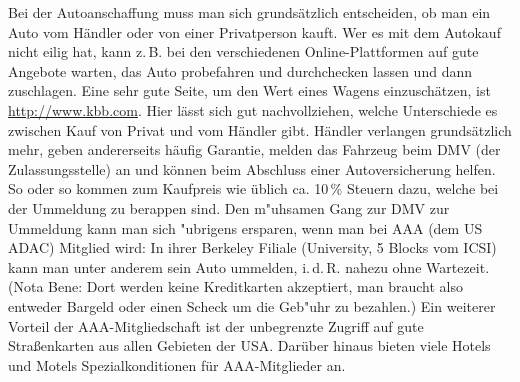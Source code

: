 \documentclass[a4paper]{scrreprt}
\begin{document}
Bei der Autoanschaffung muss man sich grundsätzlich entscheiden, ob man ein Auto vom Händler oder von einer Privatperson kauft. 
Wer es mit dem Autokauf nicht eilig hat, kann z.\,B. bei den verschiedenen Online-Plattformen auf gute Angebote warten, das Auto probefahren und durchchecken lassen und dann zuschlagen. 
Eine sehr gute Seite, um den Wert eines Wagens einzuschätzen, ist \url{http://www.kbb.com}. 
Hier lässt sich gut nachvollziehen, welche Unterschiede es zwischen Kauf von Privat und vom Händler gibt. 
Händler verlangen grundsätzlich mehr, geben andererseits häufig Garantie, melden das Fahrzeug beim DMV (der Zulassungsstelle) an und können beim Abschluss einer Autoversicherung helfen. 
So oder so kommen zum Kaufpreis wie üblich ca. 10\,\% Steuern dazu, welche bei der Ummeldung zu berappen sind.
Den m"uhsamen Gang zur DMV zur Ummeldung kann man sich "ubrigens ersparen, wenn man bei AAA (dem US ADAC) Mitglied wird: In ihrer Berkeley Filiale (University, 5 Blocks vom ICSI) kann man unter anderem sein Auto ummelden, i.\,d.\,R. nahezu ohne Wartezeit.
(Nota Bene: Dort werden keine Kreditkarten akzeptiert, man braucht also entweder Bargeld oder einen Scheck um die Geb"uhr zu bezahlen.) Ein weiterer Vorteil der AAA-Mitgliedschaft ist der unbegrenzte Zugriff auf gute Straßenkarten aus allen Gebieten der USA. Darüber hinaus bieten viele Hotels und Motels Spezialkonditionen für AAA-Mitglieder an.
\end{document}
